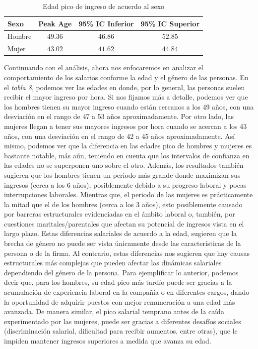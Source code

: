 \documentclass[10pt]{article}
\begin{document}
\begin{table}[!htbp] 
    \centering 
    \caption{Edad pico de ingreso de acuerdo al sexo} 
    \label{tab:peak_age} 
    \begin{tabular}{lccc} 
        \toprule
        Sexo & Peak Age & 95\% IC Inferior & 95\% IC Superior \\ 
        \midrule
        Hombre & $49.36$ & $46.86$ & $52.85$ \\ 
        Mujer & $43.02$ & $41.62$ & $44.84$ \\ 
        \bottomrule
    \end{tabular} 
\end{table}
Continuando con el análisis, ahora nos enfocaremos en analizar el comportamiento de los salarios conforme la edad y el género de las personas. En el \textit{tabla 8}, podemos ver las edades en donde, por lo general, las personas suelen recibir el mayor ingreso por hora. Si nos fijamos más a detalle, podemos ver que los hombres tienen su mayor ingreso cuando están cercanos a los 49 años, con una desviación en el rango de 47 a 53 años aproximadamente. Por otro lado, las mujeres llegan a tener sus mayores ingresos por hora cuando se acercan a los 43 años, con una desviación en el rango de 42 a 45 años aproximadamente. Así mismo, podemos ver que la diferencia en las edades pico de hombres y mujeres es bastante notable, más aún, teniendo en cuenta que los intervalos de confianza en las edades no se superponen uno sobre el otro. Además, los resultados también sugieren que los hombres tienen un periodo más grande donde maximizan sus ingresos (cerca a los 6 años), posiblemente debido a su progreso laboral y pocas interrupciones laborales. Mientras que, el periodo de las mujeres es prácticamente la mitad que el de los hombres (cerca a los 3 años), esto posiblemente causado por barreras estructurales evidenciadas en el ámbito laboral o, también, por cuestiones maritales/parentales que afectan su potencial de ingresos vista en el largo plazo. 
Estas diferencias salariales de acuerdo a la edad, sugieren que la brecha de género no puede ser vista únicamente desde las características de la persona o de la firma. Al contrario, estas diferencias nos sugieren que hay causas estructurales más complejas que pueden afectar las dinámicas salariales dependiendo del género de la persona. Para ejemplificar lo anterior, podemos decir que, para los hombres, su edad pico más tardío puede ser gracias a la acumulación de experiencia laboral en la compañía o en diferentes cargos, dando la oportunidad de adquirir puestos con mejor remuneración a una edad más avanzada. De manera similar, el pico salarial temprano antes de la caída experimentado por las mujeres, puede ser gracias a diferentes desafíos sociales (discriminación salarial, dificultad para recibir aumentos, entre otras), que le impiden mantener ingresos superiores a medida que avanza su edad. 
\end{document}
